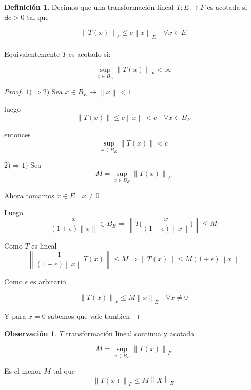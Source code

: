 \documentclass[12pt]{article}
\newcommand{\Ra}{\Rightarrow}
\newcommand{\ra}{\rightarrow}
\newcommand{\norm}[1]{\left\lVert#1\right\rVert}
\theoremstyle{definition}
\newtheorem{definition}{Definición}[section]
\newtheorem*{remark}{Observación}
\begin{document}
\begin{definition}
Decimos que una transformación lineal $T:E \ra F$ es acotada si $\exists c > 0 $ tal que 

    $$ \norm{T(x)}_{F} \leq c \norm{x}_{E} \quad \forall x \in E$$ \\

 \noindent   Equivalentemente $T$ es acotado si:

    $$ \sup_{x \in B_{E}}{\norm{T(x)}_{F}} < \infty$$
    
  \end{definition}


\begin{proof}
	$1) \Ra 2)$ Sea $x \in B_{E} \ra \norm{x} < 1$ 

	luego $$ \norm{T(x)} \leq c \norm{x} < c \quad \forall x \in B_{E}$$ 

	entonces $$ \sup_{x \in B_{E} }\norm{T(x)} < c $$
	
  $ 2) \Ra 1)$ Sea $$M = \sup_{x \in B_{E}}{\norm {T(x)}_{F}}$$

Ahora tomamos $ x \in E \quad x \neq 0 $

Luego $$ \frac{x}{(1+ \epsilon)\norm{x}} \in B_{E} \Ra \norm{T \biggl( \frac{x}{(1+ \epsilon)\norm{x}}\biggr) } \leq M$$
      
Como $T$ es lineal $$ \norm{\frac{1}{(1+\epsilon)\norm{x}}T(x)} \leq M \Ra \norm{T(x)} \leq M(1+ \epsilon) \norm{x}$$ 

Como $\epsilon$ es arbitario 

$$ \norm{T(x)}_{F} \leq M \norm{x}_{E} \quad \forall x \neq0$$ 

Y para $x=0$ sabemos que vale tambien 
      \end{proof}

      \begin{remark}
	$T$ transformación lineal continua y acotada

	$$M = \sup_{x \in B_{E}}{\norm {T(x)}_{F}}$$

	Es el menor $M$ tal que $$ \norm{T(x)}_{F} \leq M \norm{X}_{E}$$
      	
	
      \end{remark}
\end{document}
